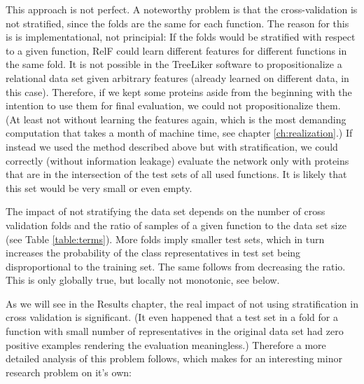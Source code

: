 \documentclass[11pt,twoside,a4paper]{book}
\begin{document}
This approach is not perfect. 
A noteworthy problem is that the cross-validation is not stratified,
since the folds are the same for each function.
The reason for this is is implementational, not principial:
If the folds would be stratified with respect to a given 
function, RelF could learn different features for different functions
in the same fold.
It is not possible in the TreeLiker software to 
propositionalize a relational data set given arbitrary features
(already learned on different data, in this case).
Therefore, if we kept some proteins aside from the beginning 
with the intention to use them for final evaluation,
we could not propositionalize them.
(At least not without learning the features again,
which is the most demanding computation that takes a month of machine time, see chapter \ref{ch:realization}.)
If instead we used the method described above but with stratification,
we could correctly (without information leakage) evaluate the network only with proteins
that are in the intersection of the test sets of all used functions.
It is likely that this set would be very small or even empty.

The impact of not stratifying the data set depends on the number of cross validation folds
and the ratio of samples of a given function to the data set size (see Table \ref{table:terms}).
More folds imply smaller test sets, 
which in turn increases the probability of the class representatives in test set
being disproportional to the training set.
The same follows from decreasing the ratio.
This is only globally true, but locally not monotonic, see below.

As we will see in the Results chapter, the real impact of not using stratification
in cross validation is significant.
(It even happened that a test set in a fold for a function with small number of representatives in
the original data set had zero positive examples rendering the evaluation meaningless.)
Therefore a more detailed analysis of this problem follows,
which makes for an interesting minor research problem on it's own:
\end{document}
